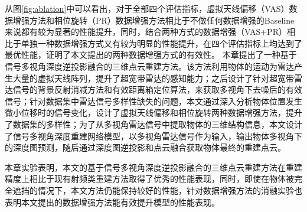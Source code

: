 从图\ref{fig:ablation}中可以看出，对于全部四个评估指标，虚拟天线偏移（VAS）数据增强方法和相位旋转（PR）数据增强方法相比于不做任何数据增强的Baseline来说都有较为显著的性能提升，同时，结合两种方式的数据增强（VAS+PR）相比于单独一种数据增强方式又有较为明显的性能提升，在四个评估指标上均达到了最优性能，证明了本文提出的两种数据增强方式的有效性。
本章提出了一种基于信号多视角深度逆投影融合的三维点云重建方法。该方法利用物体的运动为雷达产生大量的虚拟天线阵列，提升了超宽带雷达的感知能力；之后设计了针对超宽带雷达信号的背景反射消减方法和有效距离箱定位算法，来获取多视角下去噪后的有效信号；针对数据集中雷达信号多样性缺失的问题，本文通过深入分析物体位置发生微小位移时的信号变化，设计了虚拟天线偏移和相位旋转两种数据增强方法，提升了数据集的多样性；为了从多视角雷达信号中提取物体的三维结构信息，本文设计了信号多视角深度重建网络模型，以多视角雷达信号作为输入，输出物体多视角下的深度图预测，随后通过深度图逆投影和点云融合获取物体最终的重建点云。

本章实验表明，本文的基于信号多视角深度逆投影融合的三维点云重建方法在重建精度上相比于现有射频类重建方法取得了优秀的性能表现，同时，即使在物体被完全遮挡的情况下，本文方法仍能保持较好的性能，针对数据增强方法的消融实验也表明本文提出的数据增强方法能有效提升模型的性能表现。